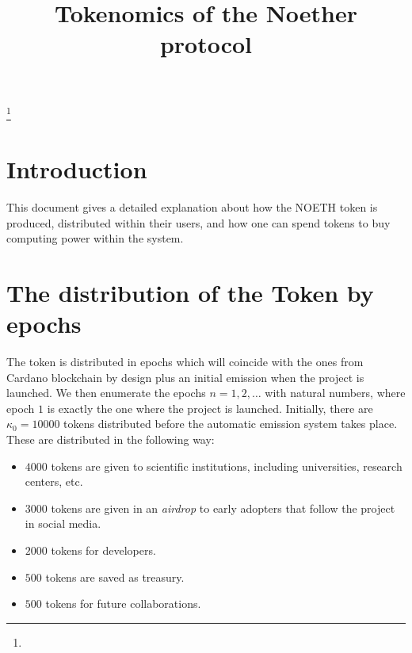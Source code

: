 \documentclass[11pt]{amsart}
\numberwithin{equation}{section}
\theoremstyle{definition}
\theoremstyle{remark}
\renewcommand{\_}[1]{_{\left( #1 \right)}}
\renewcommand{\^}[1]{^{\left( #1 \right)}}
\begin{document}
\noindent
\title[Tokenomics of the Noether protocol]
{Tokenomics of the Noether protocol}





\thanks{}




\maketitle

\section*{Introduction}
This document gives a detailed explanation about how the NOETH token is produced, distributed within their users, and how one can spend tokens to buy computing power within the system. 


\section{The distribution of the Token by epochs}

The token is distributed in epochs which will coincide with the ones from Cardano blockchain by design plus an initial emission when the project is launched. We then enumerate the epochs $n=1,2,\dots$ with natural numbers, where epoch $1$ is exactly the one where the project is launched. Initially, there are $\kappa_0 = 10000$ tokens distributed before the automatic emission system takes place. These are distributed in the following way:
\begin{itemize}
	\item $4000$ tokens are given to scientific institutions, including universities, research centers, etc.
	\item $3000$ tokens are given in an \emph{airdrop} to early adopters that follow the project in social media.
	\item $2000$ tokens for developers.
	\item $500$ tokens are saved as treasury.
	\item $500$ tokens for future collaborations.
\end{itemize}
\end{document}
